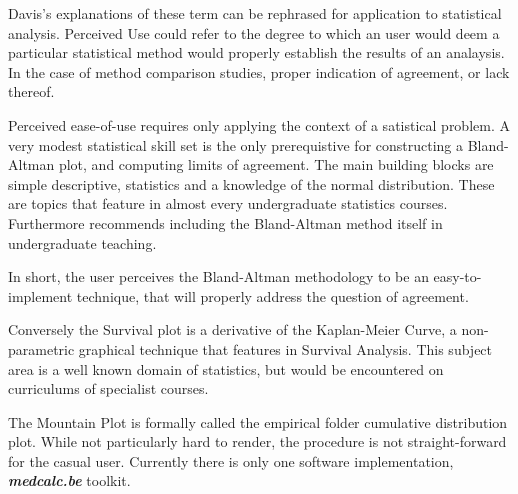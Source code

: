 \documentclass[12pt, a4paper]{report}
\theoremstyle{plain}
\theoremstyle{definition}
\theoremstyle{remark}
\begin{document}
	Davis's explanations of these term can be rephrased for application to statistical analysis. 
	Perceived Use could refer to the degree to which an user would deem a particular statistical method would properly establish the results of an analaysis. In the case of method comparison studies, proper indication of agreement, or lack thereof.
	
	
	Perceived ease-of-use requires only applying the context of a satistical problem. A very modest statistical skill set is the only prerequistive for constructing a Bland-Altman plot, and computing limits of agreement. The main building blocks 
	are simple descriptive, statistics and a knowledge of the normal distribution. These are topics that feature in almost every undergraduate statistics courses. Furthermore \citet{kikozak2014including} recommends including the Bland-Altman method itself in undergraduate teaching.
	
	In short, the user perceives the Bland-Altman methodology to be an easy-to-implement technique, that will properly address the question of agreement.
	
	Conversely the Survival plot is a derivative of the Kaplan-Meier Curve, a non-parametric graphical technique that features in Survival Analysis. This subject area is a well known domain of statistics, but would be encountered 
	on curriculums of specialist courses. 
	
	The Mountain Plot is formally called the empirical folder cumulative distribution plot. While not particularly hard to render, the procedure is not straight-forward for the casual user. Currently there is only one software implementation, \textbf{\textit{medcalc.be}} toolkit.
\end{document}
